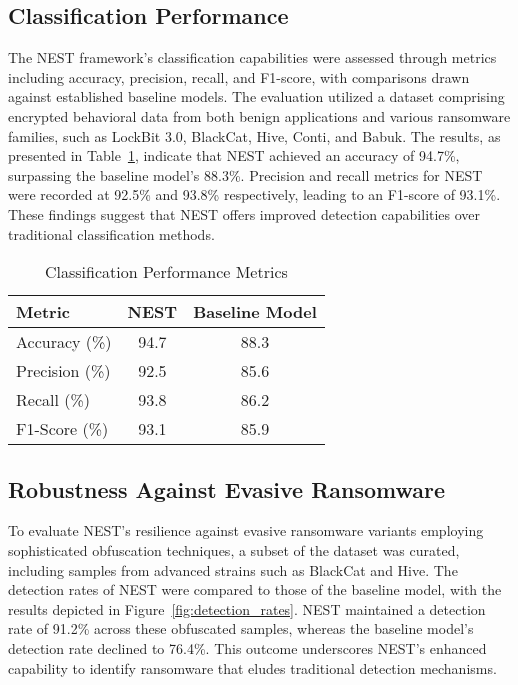 \documentclass[lettersize,journal]{IEEEtran}
\begin{document}
\subsection{Classification Performance}

The NEST framework's classification capabilities were assessed through metrics including accuracy, precision, recall, and F1-score, with comparisons drawn against established baseline models. The evaluation utilized a dataset comprising encrypted behavioral data from both benign applications and various ransomware families, such as LockBit 3.0, BlackCat, Hive, Conti, and Babuk. The results, as presented in Table~\ref{tab:classification_performance}, indicate that NEST achieved an accuracy of 94.7\%, surpassing the baseline model's 88.3\%. Precision and recall metrics for NEST were recorded at 92.5\% and 93.8\% respectively, leading to an F1-score of 93.1\%. These findings suggest that NEST offers improved detection capabilities over traditional classification methods.

\begin{table}[h]
	\centering
	\caption{Classification Performance Metrics}
	\label{tab:classification_performance}
	\begin{tabular}{|l|c|c|}
		\hline
		\textbf{Metric} & \textbf{NEST} & \textbf{Baseline Model} \\
		\hline
		Accuracy (\%) & 94.7 & 88.3 \\
		Precision (\%) & 92.5 & 85.6 \\
		Recall (\%) & 93.8 & 86.2 \\
		F1-Score (\%) & 93.1 & 85.9 \\
		\hline
	\end{tabular}
\end{table}

\subsection{Robustness Against Evasive Ransomware}

To evaluate NEST's resilience against evasive ransomware variants employing sophisticated obfuscation techniques, a subset of the dataset was curated, including samples from advanced strains such as BlackCat and Hive. The detection rates of NEST were compared to those of the baseline model, with the results depicted in Figure~\ref{fig:detection_rates}. NEST maintained a detection rate of 91.2\% across these obfuscated samples, whereas the baseline model's detection rate declined to 76.4\%. This outcome underscores NEST's enhanced capability to identify ransomware that eludes traditional detection mechanisms.
\end{document}
